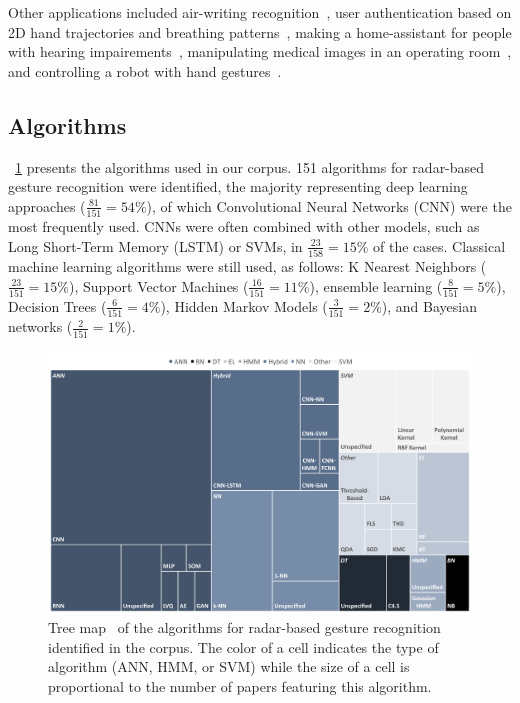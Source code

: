 Other applications included air-writing recognition~\cite{Wang:2020a}, user authentication based on 2D hand trajectories and breathing patterns~\cite{Leem:2020b}, making a home-assistant for people with hearing impairements~\cite{Santhalingam:2020b}, manipulating medical images in an operating room~\cite{Miller:2020}, and controlling a robot with hand gestures~\cite{Zhang:2020a,Li:2009}.

\subsection{Algorithms} \label{sec:state_of_the_art:radar:algorithms}

\fig~\ref{fig:state_of_the_art:radar:algorithms} presents the algorithms used in our corpus.
151 algorithms for radar-based gesture recognition were identified, the majority representing deep learning approaches ($\frac{81}{151}=54\%$), of which Convolutional Neural Networks (CNN) were the most frequently used.
CNNs were often combined with other models, such as Long Short-Term Memory (LSTM) or SVMs, in $\frac{23}{158}=15\%$ of the cases.
Classical machine learning algorithms were still used, as follows: K Nearest Neighbors ($\frac{23}{151}=15\%$), Support Vector Machines ($\frac{16}{151}=11\%$), ensemble learning ($\frac{8}{151}=5\%$), Decision Trees ($\frac{6}{151}=4\%$), Hidden Markov Models ($\frac{3}{151}=2\%$), and Bayesian networks ($\frac{2}{151}=1\%$). 

\begin{figure}[!b]
    \centering
    \includegraphics[width=\linewidth]{Figures/StateOfTheArt/Radar/treemap-algorithms.pdf}
    \vspace{-10pt}
    \caption{Tree map~\cite{Shneiderman:1992} of the algorithms for radar-based gesture recognition identified in the corpus. The color of a cell indicates the type of algorithm (\eg ANN, HMM, or SVM) while the size of a cell is proportional to the number of papers featuring this algorithm.}
    \label{fig:state_of_the_art:radar:algorithms}
\end{figure}


